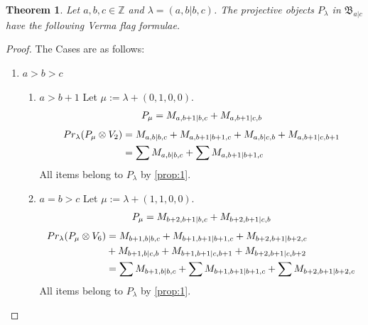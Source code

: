 \documentclass[12pt,a4paper]{article}
\newtheorem{theorem}{Theorem}[section]
\begin{document}
\begin{theorem}
  Let $a,b,c \in \mathbb{Z}$ and $\lambda = (a,b|b,c)$. The projective objects $P_{\lambda}$ in $\mathfrak{B}_{a|c}$ have the following Verma flag formulae.
\end{theorem}
\begin{proof} The Cases are as follows:\par
\begin{enumerate}
  \item $a>b>c$
  \begin{enumerate}
    \item $a>b+1$
        Let $\mu:=\lambda + (0,1,0,0) $. 
\begin{equation}\notag
  \begin{aligned}
      P_{\mu} =
M_{a,b+1|b,c}
+M_{a,b+1|c,b}
  \end{aligned}
\end{equation}
\begin{equation}\notag
  \begin{aligned}
    Pr_{\lambda}(P_\mu \otimes V_2) &=
M_{a,b|b,c}
+M_{a,b+1|b+1,c}
+M_{a,b|c,b}
+M_{a,b+1|c,b+1}\\
                                    &=
\sum M_{a,b|b,c}
+\sum M_{a,b+1|b+1,c}
  \end{aligned}
\end{equation}
All items belong to $P_\lambda$ by \cref{prop:1}.
    
\item $a=b>c$
        Let $\mu:=\lambda + (1,1,0,0) $. 
\begin{equation}\notag
  \begin{aligned}
      P_{\mu} =
M_{b+2,b+1|b,c}
+M_{b+2,b+1|c,b}
  \end{aligned}
\end{equation}
\begin{equation}\notag
  \begin{aligned}
  Pr_{\lambda}(P_\mu \otimes V_6) &=
M_{b+1,b|b,c}
+M_{b+1,b+1|b+1,c}
+M_{b+2,b+1|b+2,c} \\
                                  &+
M_{b+1,b|c,b}
+M_{b+1,b+1|c,b+1} 
+M_{b+2,b+1|c,b+2} \\
                                    &=
\sum M_{b+1,b|b,c}
+\sum M_{b+1,b+1|b+1,c}
+\sum M_{b+2,b+1|b+2,c}
  \end{aligned}
\end{equation}
All items belong to $P_\lambda$ by \cref{prop:1}.
  \end{enumerate}


\end{enumerate}
\end{proof}
\end{document}
